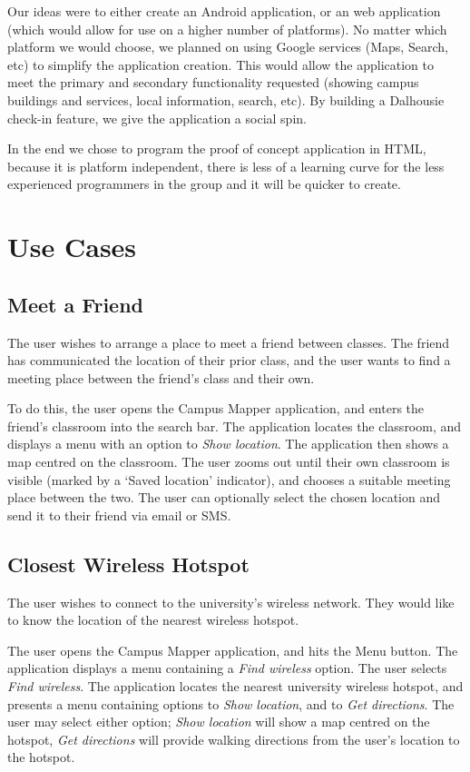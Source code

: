 \documentclass{article}
\begin{document}
Our ideas were to either create an Android application, or an web application
(which would allow for use on a higher number of platforms). No matter which
platform we would choose, we planned on using Google services (Maps, Search,
etc) to simplify the application creation. This would allow the application to
meet the primary and secondary functionality requested (showing campus buildings
and services, local information, search, etc). By building a Dalhousie check-in
feature, we give the application a social spin.

In the end we chose to program the proof of concept application in HTML, because
it is platform independent, there is less of a learning curve for the less
experienced programmers in the group and it will be quicker to create.

\section{Use Cases}
\subsection{Meet a Friend}
The user wishes to arrange a place to meet a friend between classes.
The friend has communicated the location of their prior class, and the user
wants to find a meeting place between the friend's class and their own.

To do this, the user opens the Campus Mapper application, and enters the
friend's classroom into the search bar. The application locates the classroom,
and displays a menu with an option to \emph{Show location}. The application
then shows a map centred on the classroom. The user zooms out until their own
classroom is visible (marked by a `Saved location' indicator), and chooses a
suitable meeting place between the two. The user can optionally select the
chosen location and send it to their friend via email or SMS.

\subsection{Closest Wireless Hotspot}
The user wishes to connect to the university's wireless network. They would like
to know the location of the nearest wireless hotspot.

The user opens the Campus Mapper application, and hits the Menu button. The
application displays a menu containing a \emph{Find wireless} option.
The user selects \emph{Find wireless}. The application locates the nearest
university wireless hotspot, and presents a menu containing options to
\emph{Show location}, and to \emph{Get directions}. The user may select either
option; \emph{Show location} will show a map centred on the hotspot, \emph{Get
directions} will provide walking directions from the user's location to the
hotspot.
\end{document}
